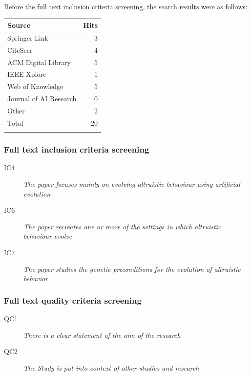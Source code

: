 \documentclass[a4paper]{book}
\begin{document}
Before the full text inclusion criteria screening, the search results were as follows:
\begin{center}
    \begin{tabular}{|l|r|}
    \hline
	Source				& Hits 	\\ \hline
	Springer Link 			& 3 	\\ \hline
	CiteSeer    			& 4 \\ \hline
    	ACM Digital Library 		& 5 \\ \hline
    	IEEE Xplore 			& 1  \\ \hline
	Web of Knowledge 		& 5 \\ \hline
    	Journal of AI Research 		& 0 	\\ \hline
	Other  				& 2 \\ \hline \hline
	Total				& 20 \\
    \hline
     \label{table:SearchResults}
   \end{tabular}
\end{center}


\subsubsection{Full text inclusion criteria screening}

\begin{description}
\item[IC4] {\it The paper focuses mainly on evolving altruistic behaviour using artificial evolution}
\item[IC6] {\it The paper recreates one or more of the settings in which altruistic behaviour evolve}
\item[IC7] {\it The paper studies the genetic preconditions for the evolution of altruistic behavior}
\end{description}

\subsubsection{Full text quality criteria screening}

\begin{description}
\item[QC1] {\it There is a clear statement of the aim of the research} 
\item[QC2] {\it The Study is put into context of other studies and research}
\end{description}
\end{document}

